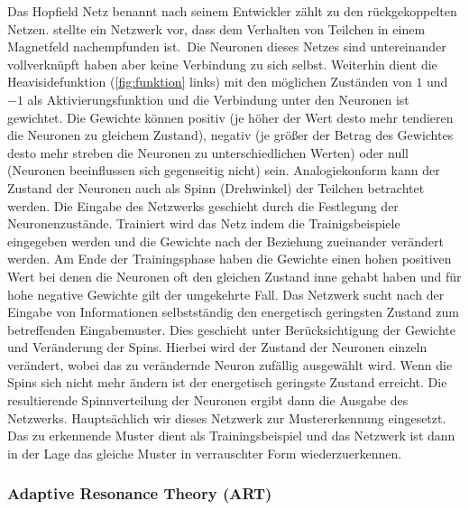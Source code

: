 Das Hopfield Netz benannt nach seinem Entwickler zählt zu den rückgekoppelten Netzen. \citet{HOPFIELD1986} stellte ein Netzwerk vor, dass dem Verhalten von Teilchen in einem Magnetfeld nachempfunden ist.\, Die Neuronen dieses Netzes sind untereinander vollverknüpft haben aber keine Verbindung zu sich selbst. Weiterhin dient die Heavisidefunktion (\autoref{fig:funktion} links) mit den möglichen Zuständen von $1$ und $-1$ als Aktivierungsfunktion und die Verbindung unter den Neuronen ist gewichtet. Die Gewichte können positiv (je höher der Wert desto mehr tendieren die Neuronen zu gleichem Zustand), negativ (je größer der Betrag des Gewichtes desto mehr streben die Neuronen zu unterschiedlichen Werten) oder null (Neuronen beeinflussen sich gegenseitig nicht) sein. Analogiekonform kann der Zustand der Neuronen auch als Spinn (Drehwinkel) der Teilchen betrachtet werden. Die Eingabe des Netzwerks geschieht durch die Festlegung der Neuronenzustände. Trainiert wird das Netz indem die Trainigsbeispiele eingegeben werden und die Gewichte nach der Beziehung zueinander verändert werden. Am Ende der Trainingsphase haben die Gewichte einen hohen positiven Wert bei denen die Neuronen oft den gleichen Zustand inne gehabt haben und für hohe negative Gewichte gilt der umgekehrte Fall. Das Netzwerk sucht nach der Eingabe von Informationen selbstständig den energetisch geringsten Zustand zum betreffenden Eingabemuster. Dies geschieht unter Berücksichtigung der Gewichte und Veränderung der Spins. Hierbei wird der Zustand der Neuronen einzeln verändert, wobei das zu verändernde Neuron zufällig ausgewählt wird. Wenn die Spins sich nicht mehr ändern ist der energetisch geringste Zustand erreicht. Die resultierende Spinnverteilung der Neuronen ergibt dann die Ausgabe des Netzwerks. Hauptsächlich wir dieses Netzwerk zur Mustererkennung eingesetzt. Das zu erkennende Muster dient als Trainingsbeispiel und das Netzwerk ist dann in der Lage das gleiche Muster in verrauschter Form wiederzuerkennen.


\subsubsection{Adaptive Resonance Theory (ART)}%

